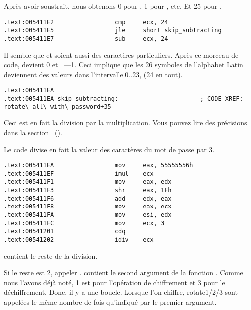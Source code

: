 Après avoir soustrait, nous obtenons 0 pour  , 1 pour , etc. Et 25 pour
.

\begin{lstlisting}[style=customasmx86]
.text:005411E2                 cmp     ecx, 24
.text:005411E5                 jle     short skip_subtracting
.text:005411E7                 sub     ecx, 24
\end{lstlisting}

Il semble que  et  soient aussi des caractères particuliers.
Après ce morceau de code,  devient 0 et ~---1.
Ceci implique que les 26 symboles de l'alphabet Latin deviennent des valeurs dans
l'intervalle 0..23, (24 en tout).

\begin{lstlisting}[style=customasmx86]
.text:005411EA
.text:005411EA skip_subtracting:                       ; CODE XREF: rotate\_all\_with\_password+35
\end{lstlisting}

Ceci est en fait la division par la multiplication.
Vous pouvez lire des précisions dans la section \q{\DivisionByMultSectionName}~().

Le code divise en fait la valeur des caractères du mot de passe par 3.
\begin{lstlisting}[style=customasmx86]
.text:005411EA                 mov     eax, 55555556h
.text:005411EF                 imul    ecx
.text:005411F1                 mov     eax, edx
.text:005411F3                 shr     eax, 1Fh
.text:005411F6                 add     edx, eax
.text:005411F8                 mov     eax, ecx
.text:005411FA                 mov     esi, edx
.text:005411FC                 mov     ecx, 3
.text:00541201                 cdq
.text:00541202                 idiv    ecx
\end{lstlisting}

\EDX contient le reste de la division.



Si le reste est 2, appeler . 
\EDI contient le second argument de la fonction .
Comme nous l'avons déjà noté, 1 est pour l'opération de chiffrement et 3 pour le
déchiffrement.
Donc, il y a une boucle. Lorsque l'on chiffre, rotate1/2/3 sont appelées le même nombre
de fois qu'indiqué par le premier argument.

